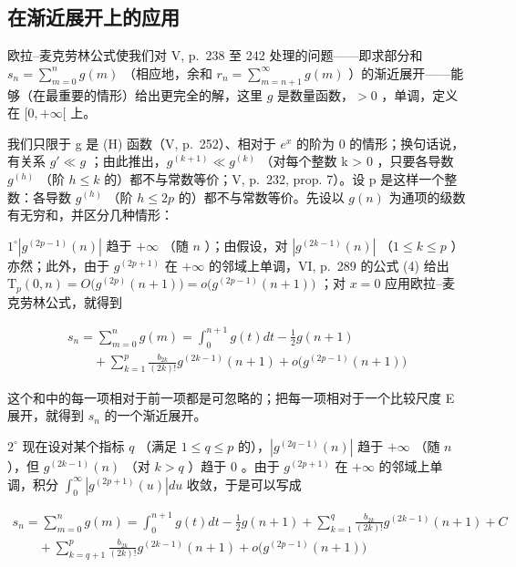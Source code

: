 \subsection{在渐近展开上的应用}

欧拉–麦克劳林公式使我们对 V, p.~238 至 242 处理的问题——即求部分和 \(s_n = \sum_{m=0}^{n} g(m)\) （相应地，余和 \(r_n = \sum_{m=n+1}^{\infty} g(m)\) ）的渐近展开——能够（在最重要的情形）给出更完全的解，这里 \(g\) 是数量函数，\(> 0\) ，单调，定义在 \([0, +\infty[\) 上。

我们只限于 g 是 (H) 函数（V, p.~252）、相对于 \(e^{x}\) 的阶为 0 的情形；换句话说，有关系 \(g' \ll g\) ；由此推出，\(g^{(k+1)} \ll g^{(k)}\) （对每个整数 k \textgreater{} 0 ，只要各导数 \(g^{(h)}\) （阶 \(h \leqslant k\) 的）都不与常数等价；V, p.~232, prop. 7）。设 p 是这样一个整数：各导数 \(g^{(h)}\) （阶 \(h \leqslant 2p\) 的）都不与常数等价。先设以 \(g(n)\) 为通项的级数有无穷和，并区分几种情形：

\(1^{\circ}\left|g^{(2p - 1)}(n)\right|\) 趋于 \(+\infty\) （随 \(n\) ）；由假设，对 \(\left|g^{(2k - 1)}(n)\right|\) （\(1\leqslant k\leqslant p\) ）亦然；此外，由于 \(g^{(2p + 1)}\) 在 \(+\infty\) 的邻域上单调，VI, p.~289 的公式 (4) 给出 \(\mathrm{T}_p(0,n) = O\big(g^{(2p)}(n + 1)\big) = o\big(g^{(2p - 1)}(n + 1)\big)\) ；对 \(x = 0\) 应用欧拉–麦克劳林公式，就得到

\[
\begin{array}{l} s _ {n} = \sum_ {m = 0} ^ {n} g (m) = \int_ {0} ^ {n + 1} g (t) d t - \frac {1}{2} g (n + 1) \\ \qquad + \sum_ {k = 1} ^ {p} \frac {b _ {2 k}}{(2 k) !} g ^ {(2 k - 1)} (n + 1) + o \big (g ^ {(2 p - 1)} (n + 1) \big) \end{array}
\]

这个和中的每一项相对于前一项都是可忽略的；把每一项相对于一个比较尺度 E 展开，就得到 \(s_{n}\) 的一个渐近展开。

\(2^{\circ}\) 现在设对某个指标 \(q\) （满足 \(1 \leqslant q \leqslant p\) 的），\(\left|g^{(2q-1)}(n)\right|\) 趋于 \(+\infty\) （随 \(n\) ），但 \(g^{(2k-1)}(n)\) （对 \(k > q\) ）趋于 0 。由于 \(g^{(2p+1)}\) 在 \(+\infty\) 的邻域上单调，积分 \(\int_0^\infty \left|g^{(2p+1)}(u)\right| du\) 收敛，于是可以写成

\[
\begin{array}{l} s _ {n} = \sum_ {m = 0} ^ {n} g (m) = \int_ {0} ^ {n + 1} g (t) d t - \frac {1}{2} g (n + 1) + \sum_ {k = 1} ^ {q} \frac {b _ {2 k}}{(2 k) !} g ^ {(2 k - 1)} (n + 1) + C \\ \qquad + \sum_ {k = q + 1} ^ {p} \frac {b _ {2 k}}{(2 k) !} g ^ {(2 k - 1)} (n + 1) + o \big (g ^ {(2 p - 1)} (n + 1) \big) \end{array}
\]

